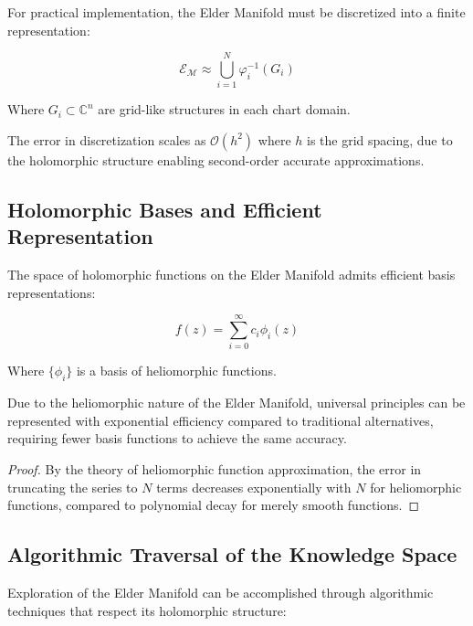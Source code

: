 For practical implementation, the Elder Manifold must be discretized into a finite representation:

\begin{equation}
\mathcal{E}_{\mathcal{M}} \approx \bigcup_{i=1}^N \varphi_i^{-1}(G_i)
\end{equation}

Where $G_i \subset \mathbb{C}^n$ are grid-like structures in each chart domain.

\begin{proposition}
The error in discretization scales as $\mathcal{O}(h^2)$ where $h$ is the grid spacing, due to the holomorphic structure enabling second-order accurate approximations.
\end{proposition}

\subsection{Holomorphic Bases and Efficient Representation}

The space of holomorphic functions on the Elder Manifold admits efficient basis representations:

\begin{equation}
f(z) = \sum_{i=0}^{\infty} c_i \phi_i(z)
\end{equation}

Where $\{\phi_i\}$ is a basis of heliomorphic functions.

\begin{theorem}
Due to the heliomorphic nature of the Elder Manifold, universal principles can be represented with exponential efficiency compared to traditional alternatives, requiring fewer basis functions to achieve the same accuracy.
\end{theorem}

\begin{proof}
By the theory of heliomorphic function approximation, the error in truncating the series to $N$ terms decreases exponentially with $N$ for heliomorphic functions, compared to polynomial decay for merely smooth functions.
\end{proof}

\subsection{Algorithmic Traversal of the Knowledge Space}

Exploration of the Elder Manifold can be accomplished through algorithmic techniques that respect its holomorphic structure:

